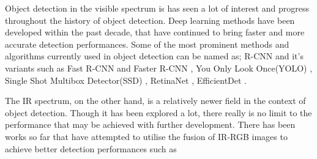 Object detection in the visible spectrum is has seen a lot of interest and progress throughout the history of object detection. Deep learning methods have been developed within the past decade, that have continued to bring faster and more accurate detection performances. Some of the most prominent methods and algorithms currently used in object detection can be named as; R-CNN \citep{girshick2014rcnn} and it's variants such as Fast R-CNN \citep{girshick2015fast} and Faster R-CNN \citep{ren2015faster}, You Only Look Once(YOLO) \citep{redmon2016look}, Single Shot Multibox Detector(SSD) \citep{Liu_2016ssd}, RetinaNet \citep{lin2018focal}, EfficientDet \citep{tan2020efficientdet}.

The IR spectrum, on the other hand, is a relatively newer field in the context of object detection. Though it has been explored a lot, there really is no limit to the performance that may be achieved with further development. There has been works so far that have attempted to utilise the fusion of IR-RGB images to achieve better detection performances such as \cite{rgb-infrared2022}







